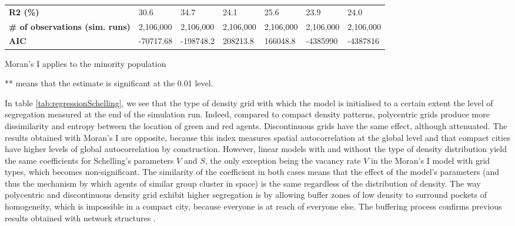 \documentclass[3p,times,procedia]{elsarticle}
\begin{document}
\begin{table}[]
\begin{threeparttable}
\begin{tabular}{|m{2.5cm}|ll|ll|ll|}
\textbf{R2 (\%)}                            & 30.6       & 34.7                             & 24.1              & 25.6              & 23.9                 & 24.0                    \\ 
\textbf{\# of observations (sim. runs)}     & 2,106,000  & 2,106,000 						 & 2,106,000          & 2,106,000          & 2,106,000             & 2,106,000                \\ 
\textbf{AIC}                                & -70717.68   & -198748.2  						& 208213.8          & 166048.8          & -4385990             & -4387816                 \\ \hline
\end{tabular}
\begin{tablenotes}
 \item Moran's I applies to the minority population
 \item *** means that the estimate is significant at the 0.01 level.
\end{tablenotes}
  \end{threeparttable}
\end{table}

In table \ref{tab:regressionSchelling}, we see that the type of density grid with which the model is initialised  to a certain extent  the level of segregation measured at the end of the simulation run. Indeed, compared to compact density patterns, polycentric grids produce more dissimilarity and entropy between the location of green and red agents. Discontinuous grids have the same effect, although attenuated. The results obtained with Moran's I are opposite, because this index measures spatial autocorrelation at the global level and that compact cities have higher levels of global autocorrelation by construction. However, linear models with and without the type of density distribution yield the same coefficients for Schelling's parameters $V$ and $S$, the only exception being the vacancy rate $V$ in the Moran's I model with grid types, which becomes non-significant. The similarity of the coefficient in both cases means that the effect of the model's parameters (and thus the mechanism by which agents of similar group cluster in space) is the same regardless of the distribution of density. The way polycentric and discontinuous density grid exhibit higher segregation is by allowing buffer zones of low density to surround pockets of homogeneity, which is impossible in a compact city, because everyone is at reach of everyone else. The buffering process confirms previous results obtained with network structures \citep{Banos2012} .
\end{document}
